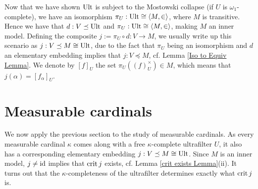 
Now that we have shown $\operatorname{Ult}$ is subject to the Mostowski collapse (if $U$ is $\omega_1$-complete), we have an isomorphism $\pi_U:\operatorname{Ult}\cong\langle M,\in\rangle$, where $M$ is transitive. Hence we have that $d:V\preceq\operatorname{Ult}$ and $\pi_U:\operatorname{Ult}\cong\langle M,\in\rangle$, making $M$ an inner model. Defining the composite $j:=\pi_U\circ d:V\to M$, we usually write up this scenario as $j:V\preceq M\cong\operatorname{Ult}$, due to the fact that $\pi_U$ being an isomorphism and $d$ an elementary embedding implies that $j:V\preceq M$, cf. Lemma \ref{Iso to Equiv Lemma}. We denote by $[f]_U$ the set $\pi_U((f)_U^\times)\in M$, which means that $j(\alpha)=[f_\alpha]_U$.

\section{Measurable cardinals}
We now apply the previous section to the study of measurable cardinals. As every measurable cardinal $\kappa$ comes along with a free $\kappa$-complete ultrafilter $U$, it also has a corresponding elementary embedding $j:V\preceq M\cong\operatorname{Ult}$. Since $M$ is an inner model, $j\neq\operatorname{id}$ implies that $\operatorname{crit} j$ exists, cf. Lemma \ref{crit exists Lemma}(ii). It turns out that the $\kappa$-completeness of the ultrafilter determines exactly what $\operatorname{crit} j$ is.

